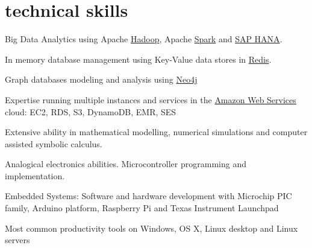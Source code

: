 \documentclass[]{friggeri-cv}
\begin{document}
\section{technical skills}
Big Data Analytics using Apache \href{http://hadoop.apache.org/}{Hadoop}, Apache \href{http://spark.apache.org/}{Spark} and \href{https://hana.sap.com/}{SAP HANA}. 

In memory database management using Key-Value data stores in \href{http://redis.io/}{Redis}.

Graph databases modeling and analysis using \href{https://neo4j.com/}{Neo4j}
   
Expertise running multiple instances and services in the \href{http://aws.amazon.com/es/}{Amazon Web Services} cloud: EC2, RDS, S3, DynamoDB, EMR, SES

Extensive ability in mathematical modelling, numerical simulations and computer assisted symbolic calculus. 

Analogical electronics abilities. Microcontroller programming and implementation. 

Embedded Systems: Software and hardware development with Microchip PIC family, Arduino platform, Raspberry Pi and Texas Instrument Launchpad

   Most common productivity tools on Windows, OS X, Linux desktop and Linux servers
   
%
\newpage
\end{document}
